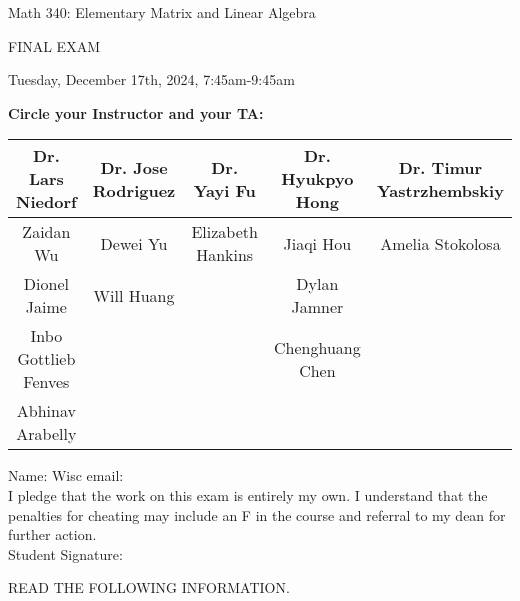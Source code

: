 \documentclass[12pt]{extarticle}
\begin{document}
\LARGE{Math 340: Elementary Matrix and Linear Algebra}

\bigskip

\Huge{FINAL EXAM} \normalsize

\bigskip

Tuesday, December 17th, 2024, 7:45am-9:45am
\vspace{.08in}

\textbf{Circle your Instructor and your TA:}

\begin{table}[h]\centering \small
\begin{tabular}{|c|c|c|c|c|}
\hline
Dr. Lars Niedorf &  Dr. Jose Rodriguez & Dr. Yayi Fu & Dr. Hyukpyo Hong & Dr. Timur Yastrzhembskiy \\ \hline
Zaidan Wu & Dewei Yu & Elizabeth Hankins & Jiaqi Hou & Amelia Stokolosa \\ \hline
Dionel Jaime & Will Huang & & Dylan Jamner & \\ \hline
Inbo Gottlieb Fenves & & & Chenghuang Chen & \\ \hline
 Abhinav Arabelly & & & & \\ \hline
\end{tabular}
\end{table}




\vspace{-.3in}

\begin{framed}
\vspace*{.2in}
Name:   Wisc email:  \vspace*{.1in} \\
I pledge that the work on this exam is entirely my own. I understand that the penalties for cheating may include an F in the course and referral to my dean for further action.
 \vspace*{.3in} \\
Student Signature: 
\end{framed}
READ THE FOLLOWING INFORMATION.
\vspace{-.1in}
\end{document}
